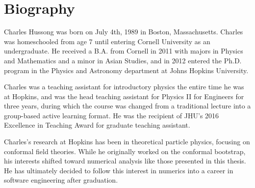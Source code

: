\documentclass[12pt]{report}
\numberwithin{equation}{section}
\begin{document}
\cleardoublepage %

\begin{refsection}


\cleardoublepage


\cleardoublepage


\cleardoublepage


\cleardoublepage


\cleardoublepage

\printbibliography[title=References]
\end{refsection}

% 

\cleardoublepage
{}
\chapter*{Biography}

Charles Hussong was born on July 4th, 1989 in Boston, Massachusetts. Charles was
homeschooled from age 7 until entering Cornell University as an undergraduate.
He received a B.A. from Cornell in 2011 with majors in Physics and Mathematics
and a minor in Asian Studies, and in 2012 entered the Ph.D. program in the
Physics and Astronomy department at Johns Hopkins University.

Charles was a teaching assistant for introductory physics the entire time he was
at Hopkins, and was the head teaching assistant for Physics II for Engineers for
three years, during which the course was changed from a traditional lecture into
a group-based active learning format. He was the recipient of JHU's 2016 
Excellence in Teaching Award for graduate teaching assistant.

Charles's research at Hopkins has been in theoretical particle physics, focusing
on conformal field theories. While he originally worked on the conformal 
bootstrap, his interests shifted toward numerical analysis like those presented
in this thesis. He has ultimately decided to follow this interest in numerics
into a career in software engineering after graduation.
\end{document}
